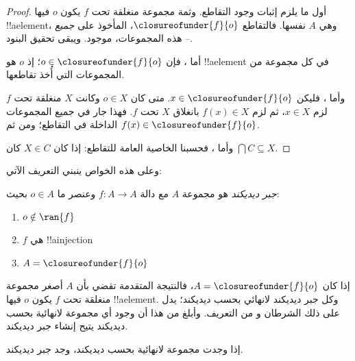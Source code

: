 \documentclass[../../../include/open-logic-section]{subfiles}
\begin{document}
\begin{proof}
أول ما يلزم إثبات وجود التقاطع. وثمة مجموعة منغلقة تحت $f$ يكون $o$ فيها
!!a{element}، وهي $A$ نفسها. فالتقاطع $\closureofunder{f}{o}$، المأخوذ على
\emph{جميع} هذه المجموعات، موجود. ويبقى تحقيق البنود
--.

أما ، فإن $o \in
\closureofunder{f}{o}$؛ إذ $o$ هو !!a{element} في كل مجموعة من المجموعات التي أُخذ تقاطعها.

وأما ، فليكن $x \in
\closureofunder{f}{o}$. متى كان $o \in X$ وكانت $X$ منغلقة تحت $f$ لزم $x \in X$، ثم لزم $f(x) \in X$ بانغلاق $X$ تحت $f$.
فهذا جار في جميع المجموعات الداخلة في التقاطع؛ ومن ثم $f(x) \in \closureofunder{f}{o}$.

وأما ، فحسبنا الخاصية العامة للتقاطع: إذا كان $X
\in C$ كان $\bigcap C \subseteq X$.
\end{proof}

وعلى هذه الخواص ينبني التعريف الآتي:

\begin{defn}
\emph{جبر ديديكند} هو مجموعة $A$ مع دالة $f
\colon A \to A$ وعنصر ما $o \in A$ بحيث:
	\begin{enumerate}
		\item {} $o \notin \ran{f}$
		\item {} $f$ هي !!a{injection}
		\item {} $A = \closureofunder{f}{o}$
	\end{enumerate}
\end{defn}

إذا كان $A = \closureofunder{f}{o}$، فالنتيجة المتقدمة تقضي بأن $A$ أصغر مجموعة منغلقة تحت $f$ يكون $o$ فيها !!a{element}. وكل جبر ديديكند لانهائي بحسب ديديكند؛ يدل على ذلك الشرطان
 و من التعريف. وأبلغ من هذا أن وجود أي مجموعة لانهائية بحسب ديديكند يتيح إنشاء جبر ديديكند.

\begin{thm}
إذا وجدت مجموعة لانهائية بحسب ديديكند، وجد جبر ديديكند.
\end{thm}
\end{document}
